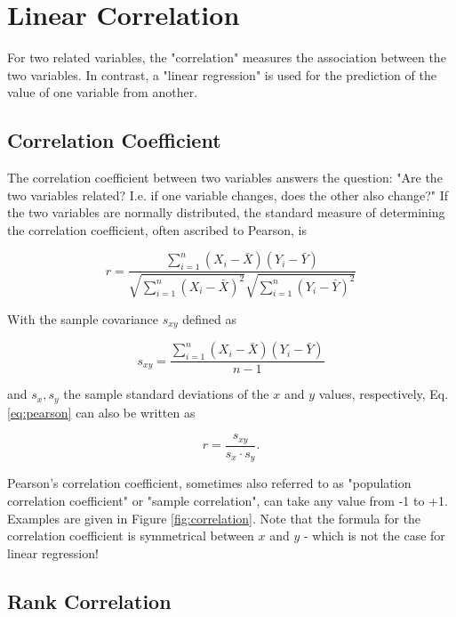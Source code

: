 \section{Linear Correlation}

For two related variables, the "correlation" measures the association between the two variables. In contrast, a "linear regression" is used for the prediction of the value of one variable from another.

\subsection{Correlation Coefficient} 

The \gls{correlation} coefficient between two variables answers the question: "Are the two variables related? I.e. if one variable changes, does the other also change?" If the two variables are normally distributed, the standard measure of determining the correlation coefficient, often ascribed to Pearson, is

\begin{equation}\label{eq:pearson}
  r = \frac{\sum\limits_{i=1}^n (X_i - \bar{X})(Y_i - \bar{Y})}{\sqrt{\sum\limits_{i=1}^n (X_i - \bar{X})^2} \sqrt{\sum\limits_{i=1}^n (Y_i - \bar{Y})^2}}
\end{equation}

With the  sample covariance $s_{xy}$ defined as

\begin{equation}
  s_{xy} = \frac{\sum\limits_{i=1}^n (X_i - \bar{X})(Y_i - \bar{Y})}{n-1}
\end{equation}

and $s_x, s_y$ the sample standard deviations of the $x$ and $y$ values, respectively,  Eq. \ref{eq:pearson} can also be written as

\begin{equation}
  r = \frac{s_{xy}}{s_x \cdot s_y}.
\end{equation}

Pearson's correlation coefficient, sometimes also referred to as "population correlation coefficient" or "sample correlation", can take any value from -1 to +1. Examples are given in Figure \ref{fig:correlation}. Note that the formula for the correlation coefficient is symmetrical between $x$ and $y$ - which is not the case for linear regression!

\subsection{Rank Correlation}

